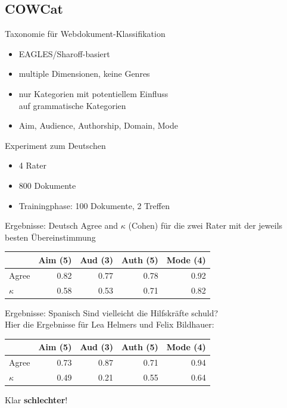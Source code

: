 \subsection{COWCat}

\begin{frame}
  {Taxonomie für Webdokument-Klassifikation}
  \begin{itemize}
    \item EAGLES/Sharoff-basiert
    \item multiple Dimensionen, keine Genres
    \item nur Kategorien mit potentiellem Einfluss\\auf grammatische Kategorien 
    \item Aim, Audience, Authorship, Domain, Mode
  \end{itemize}
\end{frame}

\begin{frame}
  {Experiment zum Deutschen}
  \begin{itemize}
    \item 4 Rater
    \item 800 Dokumente
    \item Trainingphase: 100 Dokumente, 2 Treffen
  \end{itemize}
\end{frame}

\begin{frame}
  {Ergebnisse: Deutsch}
  Agree and $\kappa$ (Cohen) für die zwei Rater mit der jeweils besten Übereinstimmung
  \vspace{0.5cm}
  \begin{center}
    \begin{tabular}[h]{lrrrr}
      \hline
      & Aim (5) & Aud (3) & Auth (5) & Mode (4) \\
      \hline
      \hline
      Agree & 0.82 & 0.77 & 0.78 & 0.92 \\
      $\kappa$ & 0.58 & 0.53 & 0.71 & 0.82 \\
      \hline
    \end{tabular}
  \end{center}
\end{frame}

\begin{frame}
  {Ergebnisse: Spanisch}
  Sind vielleicht die Hilfskräfte schuld?\\
  Hier die Ergebnisse für Lea Helmers und Felix Bildhauer:\\ 
  \vspace{0.5cm}
  \begin{center}
    \begin{tabular}[h]{lrrrr}
      \hline
      & Aim (5) & Aud (3) & Auth (5) & Mode (4) \\
      \hline
      \hline
      Agree & 0.73 & 0.87 & 0.71 & 0.94 \\
      $\kappa$ & 0.49 & 0.21 & 0.55 & 0.64 \\
      \hline
    \end{tabular}
  \end{center}
  \pause
  \vspace{0.5cm}
  Klar \textbf{schlechter}!
\end{frame}

